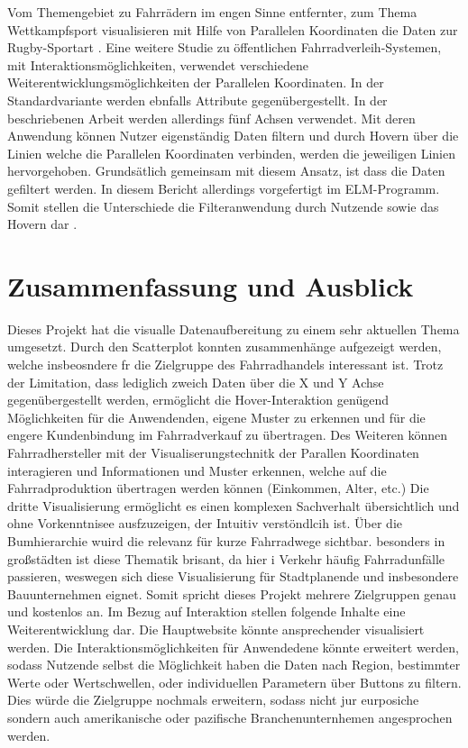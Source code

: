\documentclass[usegeometry=true]{scrartcl}
\begin{document}
Vom Themengebiet zu Fahrrädern im engen Sinne entfernter, zum Thema Wettkampfsport visualisieren mit Hilfe von Parallelen Koordinaten die Daten zur Rugby-Sportart \cite{Du.2021,Chung.2016}.
Eine weitere Studie zu öffentlichen Fahrradverleih-Systemen, mit Interaktionsmöglichkeiten, verwendet verschiedene Weiterentwicklungsmöglichkeiten der  Parallelen Koordinaten. In der Standardvariante werden ebnfalls Attribute gegenübergestellt. In der beschriebenen Arbeit werden allerdings fünf Achsen verwendet. Mit deren Anwendung können Nutzer eigenständig Daten filtern und durch Hovern über die Linien welche die Parallelen Koordinaten verbinden, werden die jeweiligen Linien hervorgehoben. Grundsätlich gemeinsam mit diesem Ansatz, ist dass die Daten gefiltert werden. In diesem Bericht allerdings vorgefertigt im ELM-Programm. Somit stellen die Unterschiede die Filteranwendung durch Nutzende sowie das Hovern dar \cite{Shi.2018}.  
\section{Zusammenfassung und Ausblick}

Dieses Projekt hat die visualle Datenaufbereitung zu einem sehr aktuellen Thema umgesetzt. Durch den Scatterplot konnten zusammenhänge aufgezeigt werden, welche insbeosndere fr die Zielgruppe des Fahrradhandels interessant ist. Trotz der Limitation, dass lediglich zweich Daten über die X und Y Achse gegenübergestellt werden, ermöglicht die Hover-Interaktion genügend Möglichkeiten für die Anwendenden, eigene Muster zu erkennen und für die engere Kundenbindung im  Fahrradverkauf zu übertragen. 
Des Weiteren können Fahrradhersteller mit der Visualiserungstechnitk der Parallen Koordinaten interagieren und Informationen und Muster erkennen, welche auf die Fahrradproduktion übertragen werden können (Einkommen, Alter, etc.)
Die dritte Visualisierung ermöglicht es einen komplexen Sachverhalt übersichtlich und ohne Vorkenntnisee ausfzuzeigen, der Intuitiv verstöndlcih ist. Über die Bumhierarchie wuird die relevanz für kurze Fahrradwege sichtbar. besonders in großstädten ist diese Thematik brisant, da hier i Verkehr häufig Fahrradunfälle passieren, weswegen sich diese Visualisierung für Stadtplanende und insbesondere Bauunternehmen eignet. 
Somit spricht dieses Projekt mehrere Zielgruppen genau und kostenlos an. 
Im Bezug auf Interaktion stellen folgende Inhalte eine Weiterentwicklung dar. Die Hauptwebsite könnte ansprechender visualisiert werden. Die Interaktionsmöglichkeiten für Anwendedene könnte erweitert werden, sodass Nutzende selbst die Möglichkeit haben die Daten nach Region, bestimmter Werte oder Wertschwellen, oder individuellen Parametern über Buttons zu filtern. Dies würde die Zielgruppe nochmals erweitern, sodass nicht jur eurposiche sondern auch amerikanische oder pazifische Branchenunternhemen angesprochen werden.
\end{document}
